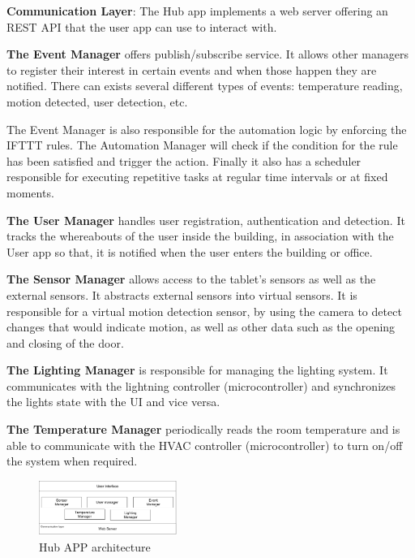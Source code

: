 \documentclass[conference]{IEEEtran}
\begin{document}
\textbf{Communication Layer}: The Hub app implements a web server offering an \ac{REST} \ac{API} that the user app can use to interact with. 

\textbf{The Event Manager} offers publish/subscribe service. It allows other managers to register their interest in certain events and when those happen they are notified. There can exists several different types of events: temperature reading, motion detected, user detection, etc.

The Event Manager is also responsible for the automation logic by enforcing the \ac{IFTTT} rules. The Automation Manager will check if the condition for the rule has been satisfied and trigger the action. Finally it also has a scheduler responsible for executing repetitive tasks at regular time intervals or at fixed moments.


\textbf{The User Manager} handles user registration, authentication and detection. It tracks the whereabouts of the user inside the building, in association with the User app so that, it is notified when the user enters the building or office.


\textbf{The Sensor Manager} allows access to the tablet's sensors as well as the external sensors. It abstracts external sensors into virtual sensors. It is responsible for a virtual motion detection sensor, by using the camera to detect changes that would indicate motion, as well as other data such as the opening and closing of the door.


\textbf{The Lighting Manager} is responsible for managing the lighting system. It communicates with the lightning controller (microcontroller) and synchronizes the lights state with the \ac{UI} and vice versa.

\textbf{The Temperature Manager} periodically reads the room temperature and is able to communicate with the \ac{HVAC} controller (microcontroller) to turn on/off the system when required.


\begin{figure}[h]
\centering
\includegraphics[width=0.4\textwidth]{Figures/software_hub}
\caption{Hub APP architecture }
\label{software2}
\end{figure}
\end{document}
